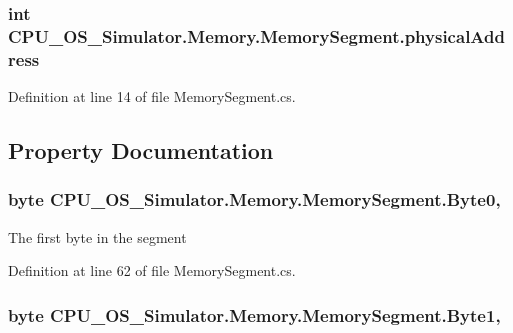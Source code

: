 \subsubsection[{physical\+Address}]{\setlength{\rightskip}{0pt plus 5cm}int C\+P\+U\+\_\+\+O\+S\+\_\+\+Simulator.\+Memory.\+Memory\+Segment.\+physical\+Address\hspace{0.3cm}{\ttfamily [private]}}\label{class_c_p_u___o_s___simulator_1_1_memory_1_1_memory_segment_af6d25683cc2a80607238dda52b09d457}


Definition at line 14 of file Memory\+Segment.\+cs.



\subsection{Property Documentation}
\hypertarget{class_c_p_u___o_s___simulator_1_1_memory_1_1_memory_segment_af1355b8170ad0461d479785ff6e1420d}{}
\subsubsection[{Byte0}]{\setlength{\rightskip}{0pt plus 5cm}byte C\+P\+U\+\_\+\+O\+S\+\_\+\+Simulator.\+Memory.\+Memory\+Segment.\+Byte0\hspace{0.3cm}{\ttfamily [get]}, {\ttfamily [set]}}\label{class_c_p_u___o_s___simulator_1_1_memory_1_1_memory_segment_af1355b8170ad0461d479785ff6e1420d}


The first byte in the segment 



Definition at line 62 of file Memory\+Segment.\+cs.

\hypertarget{class_c_p_u___o_s___simulator_1_1_memory_1_1_memory_segment_aba977f51dac4aeaa069fc14f877c7367}{}
\subsubsection[{Byte1}]{\setlength{\rightskip}{0pt plus 5cm}byte C\+P\+U\+\_\+\+O\+S\+\_\+\+Simulator.\+Memory.\+Memory\+Segment.\+Byte1\hspace{0.3cm}{\ttfamily [get]}, {\ttfamily [set]}}\label{class_c_p_u___o_s___simulator_1_1_memory_1_1_memory_segment_aba977f51dac4aeaa069fc14f877c7367}


